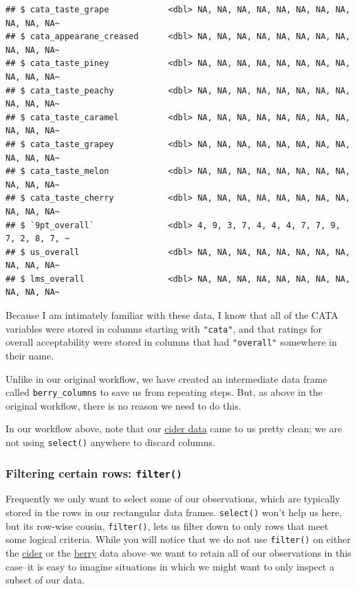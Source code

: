 \documentclass[
]{book}
\begin{document}
\begin{verbatim}
## $ cata_taste_grape            <dbl> NA, NA, NA, NA, NA, NA, NA, NA, NA, NA, NA~
## $ cata_appearane_creased      <dbl> NA, NA, NA, NA, NA, NA, NA, NA, NA, NA, NA~
## $ cata_taste_piney            <dbl> NA, NA, NA, NA, NA, NA, NA, NA, NA, NA, NA~
## $ cata_taste_peachy           <dbl> NA, NA, NA, NA, NA, NA, NA, NA, NA, NA, NA~
## $ cata_taste_caramel          <dbl> NA, NA, NA, NA, NA, NA, NA, NA, NA, NA, NA~
## $ cata_taste_grapey           <dbl> NA, NA, NA, NA, NA, NA, NA, NA, NA, NA, NA~
## $ cata_taste_melon            <dbl> NA, NA, NA, NA, NA, NA, NA, NA, NA, NA, NA~
## $ cata_taste_cherry           <dbl> NA, NA, NA, NA, NA, NA, NA, NA, NA, NA, NA~
## $ `9pt_overall`               <dbl> 4, 9, 3, 7, 4, 4, 4, 7, 7, 9, 7, 2, 8, 7, ~
## $ us_overall                  <dbl> NA, NA, NA, NA, NA, NA, NA, NA, NA, NA, NA~
## $ lms_overall                 <dbl> NA, NA, NA, NA, NA, NA, NA, NA, NA, NA, NA~
\end{verbatim}

Because I am intimately familiar with these data, I know that all of the CATA variables were stored in columns starting with \texttt{"cata"}, and that ratings for overall acceptability were stored in columns that had \texttt{"overall"} somewhere in their name.

Unlike in our original workflow, we have created an intermediate data frame called \texttt{berry\_columns} to save us from repeating steps. But, as above in the original workflow, there is no reason we need to do this.

In our workflow above, note that our \protect\hyperlink{cider}{cider data} came to us pretty clean; we are not using \texttt{select()} anywhere to discard columns.

\hypertarget{filtering-certain-rows-filter}{%
\subsubsection{\texorpdfstring{Filtering certain rows: \texttt{filter()}}{Filtering certain rows: filter()}}\label{filtering-certain-rows-filter}}

Frequently we only want to select some of our observations, which are typically stored in the rows in our rectangular data frames. \texttt{select()} won't help us here, but its row-wise cousin, \texttt{filter()}, lets us filter down to only rows that meet some logical criteria. While you will notice that we do not use \texttt{filter()} on either the \protect\hyperlink{cider}{cider} or the \protect\hyperlink{berry}{berry} data above--we want to retain all of our observations in this case--it is easy to imagine situations in which we might want to only inspect a subset of our data.
\end{document}
